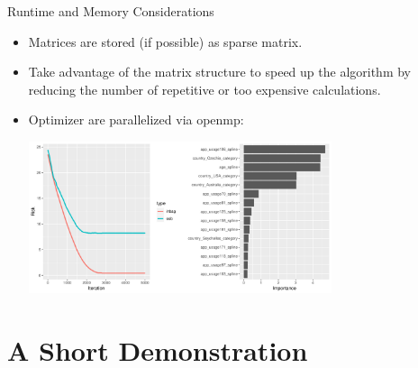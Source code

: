\documentclass[10pt]{beamer}\usepackage[]{graphicx}\usepackage[]{color}
\newenvironment{knitrout}{}{} %
\begin{document}
\begin{frame}{Runtime and Memory Considerations}

\begin{itemize}

  \item
    Matrices are stored (if possible) as sparse matrix.

  \item
    Take advantage of the matrix structure to speed up the algorithm by reducing the number of repetitive or too expensive calculations.

  \item
    Optimizer are parallelized via openmp:

\begin{knitrout}
\color{fgcolor}

{\centering \includegraphics[width=0.7\textwidth]{figure/unnamed-chunk-4-1} 

}



\end{knitrout}

\end{itemize}

\end{frame}


\section{A Short Demonstration}
\end{document}
